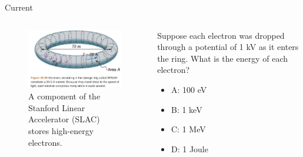 \documentclass{beamer}
\begin{document}
\begin{frame}{Current}
\begin{columns}[T]
\begin{column}{0.5\textwidth}
\begin{figure}
\centering
\includegraphics[width=\textwidth]{figures/SPEAR.png}
\caption{\label{fig:SLAC2} A component of the Stanford Linear Accelerator (SLAC) stores high-energy electrons.}
\end{figure}
\end{column}
\begin{column}{0.5\textwidth}
\small
Suppose each electron was dropped through a potential of 1 kV as it enters the ring.  What is the energy of each electron?
\begin{itemize}
\item A: 100 eV
\item B: 1 keV
\item C: 1 MeV
\item D: 1 Joule
\end{itemize}
\end{column}
\end{columns}
\end{frame}
\end{document}
